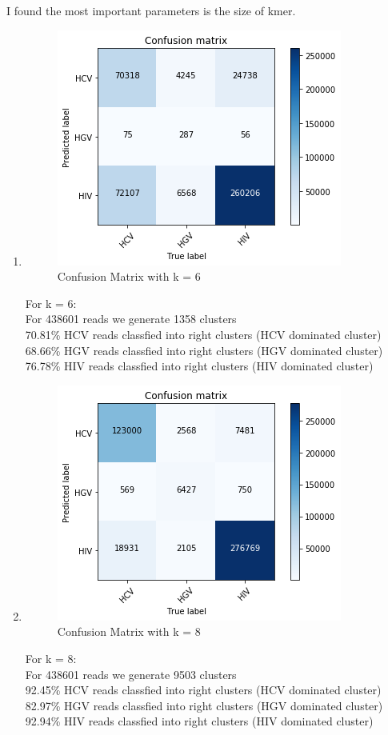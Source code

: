 \documentclass[11pt]{article}
\begin{document}
I found the most important parameters is the size of kmer.
\begin{enumerate}
	\item 
	
	\begin{figure}[H]
		\centering
		\includegraphics[width = .5\textwidth]{cm_k6.png}
		\caption{Confusion Matrix with k = 6}
		\label{fig4}
	\end{figure}
For k = 6:\\
	For 438601 reads we generate 1358 clusters\\
	70.81\% HCV reads classfied into right clusters (HCV dominated cluster)\\
	68.66\% HGV reads classfied into right clusters (HGV dominated cluster)\\
	76.78\% HIV reads classfied into right clusters (HIV dominated cluster)\\
	
	\item 
	
	\begin{figure}[H]
		\centering
		\includegraphics[width = .5\textwidth]{cm_k8.png}
		\caption{Confusion Matrix with k = 8}
		\label{fig5}
	\end{figure}
	For k = 8:\\
	For 438601 reads we generate 9503 clusters\\
	92.45\% HCV reads classfied into right clusters (HCV dominated cluster)\\
	82.97\% HGV reads classfied into right clusters (HGV dominated cluster)\\
	92.94\% HIV reads classfied into right clusters (HIV dominated cluster)\\
	

\end{enumerate}
\end{document}

